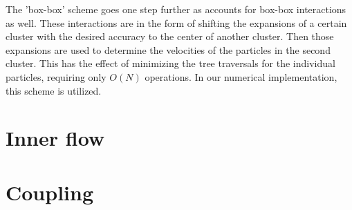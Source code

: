 The 'box-box' scheme goes one step further as accounts for box-box interactions as well. 
These interactions are in the form of shifting the expansions of a certain cluster with the desired accuracy to the center of another cluster.
Then those expansions are used to determine the velocities of the particles in the second cluster.
This has the effect of minimizing the tree traversals for the individual particles, requiring only $O(N)$ operations.
In our numerical implementation, this scheme is utilized.

\section{Inner flow}

\section{Coupling}
